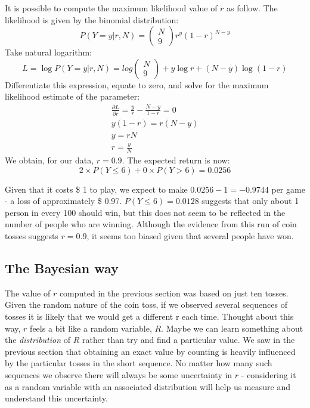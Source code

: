 It is possible to compute the maximum likelihood value of $r$ as follow.
The likelihood is given by the binomial distribution:
\begin{equation*}
P(Y=y | r, N) = \begin{pmatrix} N \\ 9 \end{pmatrix}
r^{y} (1 - r)^{N - y}
\end{equation*}
Take natural logarithm:
\begin{equation*}
L = \log P(Y=y | r, N) = log \begin{pmatrix} N \\ 9 \end{pmatrix} + 
y \log r + (N - y) \log (1 - r)
\end{equation*}
Differentiate this expression, equate to zero, and solve for the maximum likelihood estimate of the
parameter:
\begin{align*}
\frac{\partial L}{\partial r} = \frac{y}{r} - \frac{N - y}{1 - r} = 0 \\
y(1 - r) = r(N - y) \\
y = rN \\
r = \frac{y}{N}
\end{align*}
We obtain, for our data, $r = 0.9$.
The expected return is now:
\begin{equation*}
2 \times P(Y \leq 6) + 0 \times P(Y > 6) = 0.0256
\end{equation*}

Given that it costs \$ 1 to play, we expect to make $0.0256 - 1 = -0.9744$ per game -
a loss of approximately \$ 0.97.
$P(Y \leq 6) = 0.0128$ suggests that only about 1 person
in every 100 should win, but this does not seem to be reflected in the number of
people who are winning. Although the evidence from this run of coin tosses suggests
$r = 0.9$, it seems too biased given that several people have won.

\subsection{The Bayesian way}

The value of $r$ computed in the previous section was based on just ten tosses.
Given
the random nature of the coin toss, if we observed several sequences of tosses it is
likely that we would get a different r each time. Thought about this way, $r$ feels a
bit like a random variable, $R$.
Maybe we can learn something about the \emph{distribution}
of $R$ rather than try and find a particular value. We saw in the previous section
that obtaining an exact value by counting is heavily influenced by the particular
tosses in the short sequence. No matter how many such sequences we observe there
will always be some uncertainty in $r$ - considering it as a random variable with an
associated distribution will help us measure and understand this uncertainty.

